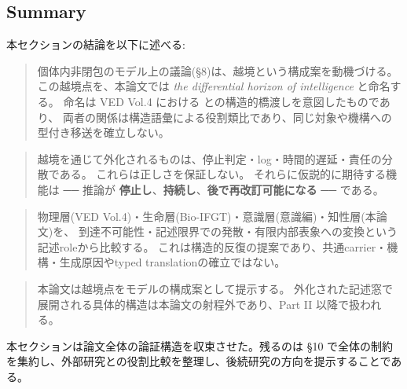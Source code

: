 \subsection{Summary}


本セクションの結論を以下に述べる:

\begin{quote}
個体内非閉包のモデル上の議論(\S{}8)は、越境という構成案を動機づける。
この越境点を、本論文では \emph{the differential horizon of intelligence} と命名する。
命名は VED Vol.4 における \DH{} との構造的橋渡しを意図したものであり、
両者の関係は構造語彙による役割類比であり、同じ対象や機構への型付き移送を確立しない。
\end{quote}

\begin{quote}
越境を通じて外化されるものは、停止判定・log・時間的遅延・責任の分散である。
これらは正しさを保証しない。
それらに仮説的に期待する機能は ──
推論が \textbf{停止し}、\textbf{持続し}、\textbf{後で再改訂可能になる} ── である。
\end{quote}

\begin{quote}
物理層(VED Vol.4)・生命層(Bio-IFGT)・意識層(意識編)・知性層(本論文)を、
到達不可能性・記述限界での発散・有限内部表象への変換という記述roleから比較する。
これは構造的反復の提案であり、共通carrier・機構・生成原因やtyped translationの確立ではない。
\end{quote}

\begin{quote}
本論文は越境点をモデルの構成案として提示する。
外化された記述窓で展開される具体的構造は本論文の射程外であり、Part II 以降で扱われる。
\end{quote}

本セクションは論文全体の論証構造を収束させた。残るのは \S{}10 で全体の制約を集約し、外部研究との役割比較を整理し、後続研究の方向を提示することである。

